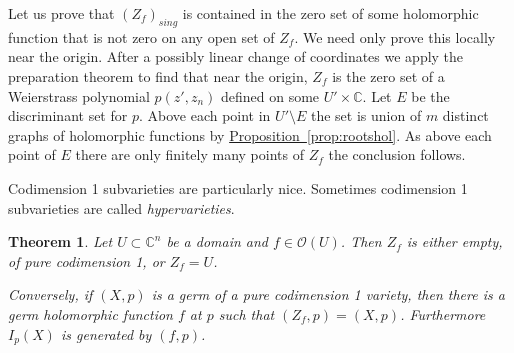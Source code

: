 \documentclass[12pt,openany]{book}
\newcommand{\C}{{\mathbb{C}}}
\newcommand{\sO}{{\mathscr{O}}}
\newcommand{\myindex}[1]{#1\index{#1}}
\theoremstyle{plain}
\newtheorem{thm}{Theorem}[section]
\theoremstyle{remark}
\theoremstyle{definition}
\theoremstyle{exercise}
\theoremstyle{example}
\newcommand{\propref}[1]{\hyperref[#1]{Proposition~\ref*{#1}}}
\begin{document}
Let us prove that $(Z_f)_{\mathit{sing}}$ is contained in the zero set of some holomorphic
function that is not zero on any open set of $Z_f$.
%
We need only prove this locally near the origin.  After a possibly
linear change of coordinates we apply the preparation theorem to find
that near the origin, $Z_f$ is the zero set of a Weierstrass polynomial
$p(z',z_n)$ defined on some $U' \times \C$.
Let $E$ be the discriminant set for $p$.  Above each
point in $U' \setminus E$ the set is union of $m$ distinct graphs
of holomorphic functions by \propref{prop:rootshol}.  As above
each point of $E$ there are only finitely many points of $Z_f$ the conclusion
follows.

%


Codimension 1 subvarieties are particularly nice.  Sometimes codimension 1
subvarieties are called \emph{\myindex{hypervarieties}}.

\begin{thm} \label{thm:codim1var}
Let $U \subset \C^n$ be a domain and $f \in \sO(U)$.
Then $Z_f$ is either empty, of pure codimension 1, or $Z_f = U$.

Conversely, if $(X,p)$ is a germ of a pure codimension 1 variety, then
there is a germ holomorphic function $f$ at $p$
such that $(Z_f,p) = (X,p)$.  Furthermore $I_p(X)$ is generated by $(f,p)$.
\end{thm}
\end{document}
